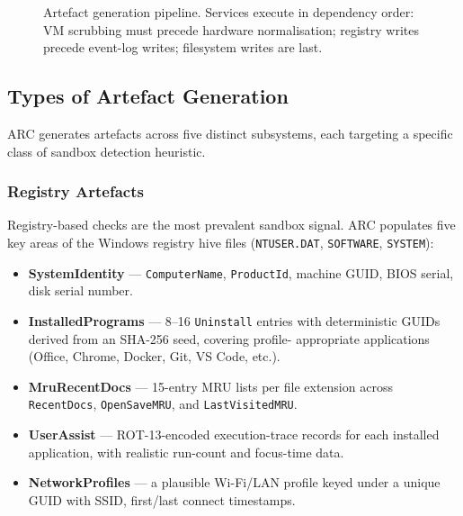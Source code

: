 \documentclass[12pt,a4paper]{article}
\begin{document}
\begin{figure}[H]
\caption{Artefact generation pipeline. Services execute in dependency order:
VM scrubbing must precede hardware normalisation; registry writes precede
event-log writes; filesystem writes are last.}
\label{fig:pipeline}
\end{figure}

\subsection{Types of Artefact Generation}
\label{sec:arttypes}

ARC generates artefacts across five distinct subsystems, each targeting a
specific class of sandbox detection heuristic.

\subsubsection{Registry Artefacts}
Registry-based checks are the most prevalent sandbox signal.  ARC populates
five key areas of the Windows registry hive files
(\texttt{NTUSER.DAT}, \texttt{SOFTWARE}, \texttt{SYSTEM}):

\begin{itemize}[noitemsep,leftmargin=2em]
  \item \textbf{SystemIdentity} — \texttt{ComputerName}, \texttt{ProductId},
        machine GUID, BIOS serial, disk serial number.
  \item \textbf{InstalledPrograms} — 8–16 \texttt{Uninstall} entries with
        deterministic GUIDs derived from an SHA-256 seed, covering profile-
        appropriate applications (Office, Chrome, Docker, Git, VS Code, etc.).
  \item \textbf{MruRecentDocs} — 15-entry MRU lists per file extension across
        \texttt{RecentDocs}, \texttt{OpenSaveMRU}, and
        \texttt{LastVisitedMRU}.
  \item \textbf{UserAssist} — ROT-13-encoded execution-trace records for each
        installed application, with realistic run-count and focus-time data.
  \item \textbf{NetworkProfiles} — a plausible Wi-Fi/LAN profile keyed under a
        unique GUID with SSID, first/last connect timestamps.
\end{itemize}
\end{document}
